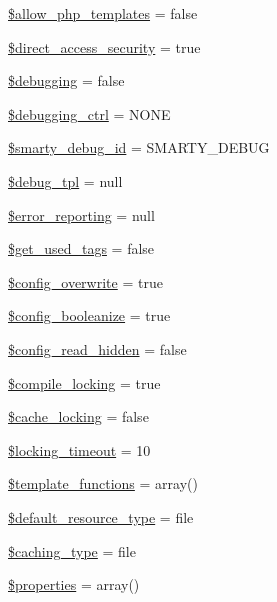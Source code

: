\begin{DoxyCompactItemize}
\item 
\hyperlink{class_smarty_ae7309c9b39378a050c4e28c675bf614f}{\$allow\+\_\+php\+\_\+templates} = false
\item 
\hyperlink{class_smarty_a96c1c358ebd9cd14712b305f6baed2ff}{\$direct\+\_\+access\+\_\+security} = true
\item 
\hyperlink{class_smarty_a22d995c07dbbe5b426d4fda3931cfcca}{\$debugging} = false
\item 
\hyperlink{class_smarty_a9b02ae21521c28e6eeb53bd58777aa7b}{\$debugging\+\_\+ctrl} = \textquotesingle{}N\+O\+N\+E\textquotesingle{}
\item 
\hyperlink{class_smarty_a1936345582d4483c652b90bbf7a51cbc}{\$smarty\+\_\+debug\+\_\+id} = \textquotesingle{}S\+M\+A\+R\+T\+Y\+\_\+\+D\+E\+B\+U\+G\textquotesingle{}
\item 
\hyperlink{class_smarty_adbe83b13ba657998e0fb861b44ecfd59}{\$debug\+\_\+tpl} = null
\item 
\hyperlink{class_smarty_ad3fc8af82ab7da1fd9dc868b28938698}{\$error\+\_\+reporting} = null
\item 
\hyperlink{class_smarty_a6b23ebecb649056690e97d5704f61f0f}{\$get\+\_\+used\+\_\+tags} = false
\item 
\hyperlink{class_smarty_a728421c1493ea20b619459924184b06d}{\$config\+\_\+overwrite} = true
\item 
\hyperlink{class_smarty_ab3e274a6c3fd439b83380c17a71255bb}{\$config\+\_\+booleanize} = true
\item 
\hyperlink{class_smarty_add257cafa2cc7f2c68381f9bcc6f4d7b}{\$config\+\_\+read\+\_\+hidden} = false
\item 
\hyperlink{class_smarty_a79bb6ea80f5980f484a13d42fe2b3bd0}{\$compile\+\_\+locking} = true
\item 
\hyperlink{class_smarty_a8ad55b9e35aac5040561ff8cc1395633}{\$cache\+\_\+locking} = false
\item 
\hyperlink{class_smarty_a94ffd62ea226a86ad2fffffe1e6d6998}{\$locking\+\_\+timeout} = 10
\item 
\hyperlink{class_smarty_a2c096c8e6fc6d2febe1fee59c6e924f8}{\$template\+\_\+functions} = array()
\item 
\hyperlink{class_smarty_a35cf3764fb77e481ca92ef131a35ca7e}{\$default\+\_\+resource\+\_\+type} = \textquotesingle{}file\textquotesingle{}
\item 
\hyperlink{class_smarty_a2b8a0f7aa1e89dd601a17c5d37966b9e}{\$caching\+\_\+type} = \textquotesingle{}file\textquotesingle{}
\item 
\hyperlink{class_smarty_a7f675de4b5983d7e84f6573b7d4d453d}{\$properties} = array()

\end{DoxyCompactItemize}
